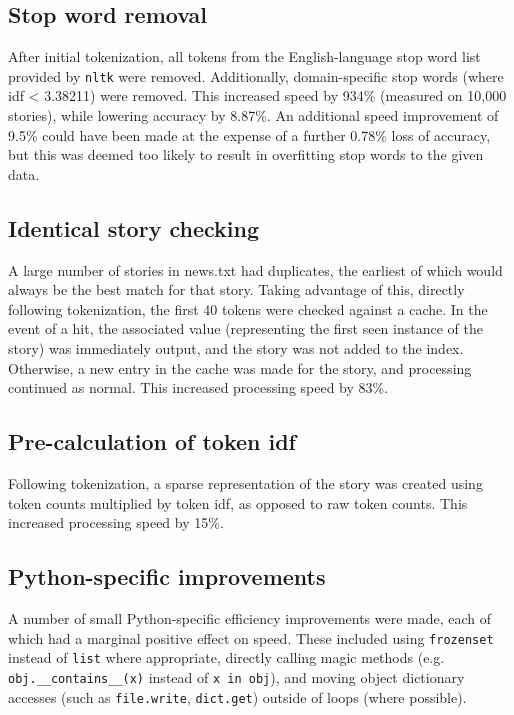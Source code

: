 \documentclass{article}
\begin{document}
\subsection{Stop word removal}
After initial tokenization, all tokens from the English-language stop word list provided by \texttt{nltk} were removed. Additionally, domain-specific stop words (where idf < 3.38211) were removed. This increased speed by 934\% (measured on 10,000 stories), while lowering accuracy by 8.87\%. An additional speed improvement of 9.5\% could have been made at the expense of a further 0.78\% loss of accuracy, but this was deemed too likely to result in overfitting stop words to the given data.
\subsection{Identical story checking}
A large number of stories in news.txt had duplicates, the earliest of which would always be the best match for that story. Taking advantage of this, directly following tokenization, the first 40 tokens were checked against a cache. In the event of a hit, the associated value (representing the first seen instance of the story) was immediately output, and the story was not added to the index. Otherwise, a new entry in the cache was made for the story, and processing continued as normal. This increased processing speed by 83\%.
\subsection{Pre-calculation of token idf}
Following tokenization, a sparse representation of the story was created using token counts multiplied by token idf, as opposed to raw token counts. This increased processing speed by 15\%.
\subsection{Python-specific improvements}
A number of small Python-specific efficiency improvements were made, each of which had a marginal positive effect on speed. These included using \texttt{frozenset} instead of \texttt{list} where appropriate, directly calling magic methods (e.g. \texttt{obj.\_\_contains\_\_(x)} instead of \texttt{x in obj}), and moving object dictionary accesses (such as \texttt{file.write}, \texttt{dict.get}) outside of loops (where possible).
\end{document}
